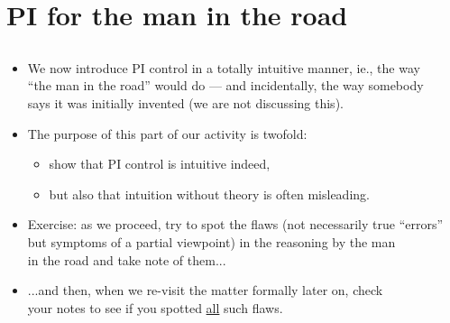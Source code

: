 \section{PI for the man in the road}
\subsection{}

\begin{frame}
\myPause
 \begin{itemize}[<+-| alert@+>]
 \item We now introduce PI control in a totally intuitive manner, ie., the way\\
       ``the man in the road'' would do --- and incidentally, the way somebody\\
       says it was initially invented (we are not discussing this).
 \item The purpose of this part of our activity is twofold:
       \begin{itemize}[<+-| alert@+>]
       \item show that PI control is intuitive indeed,
       \item but also that intuition without theory is often misleading.    
       \end{itemize}
 \item Exercise: as we proceed, try to spot the flaws (not necessarily true ``errors''\\
       but symptoms of a partial viewpoint) in the reasoning by the man\\
       in the road and take note of them...
 \item[] \vspace{-0.75mm}...and then, when we re-visit the matter formally later on, check\\
       your notes to see if you spotted \underline{all} such flaws.
 \end{itemize}
\end{frame}

